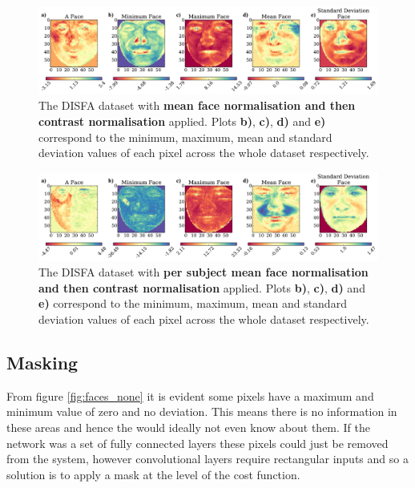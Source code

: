       \begin{figure}[!h] \centering
      \includegraphics[width =\hsize]{figures/faces_contrast_face.pdf}
      \caption{The DISFA dataset with {\bf mean face normalisation and then contrast normalisation} applied.
      Plots {\bf b)}, {\bf c)}, {\bf d)} and {\bf e)} correspond to the minimum,
      maximum, mean and standard deviation values of each pixel across the whole
      dataset respectively.} \label{fig:faces_contrast_face} \end{figure}

      \begin{figure}[!h] \centering
      \includegraphics[width =\hsize]{figures/faces_per_subject_contrast_face.pdf}
      \caption{The DISFA dataset with {\bf per subject mean face normalisation and then contrast normalisation} applied.
      Plots {\bf b)}, {\bf c)}, {\bf d)} and {\bf e)} correspond to the minimum,
      maximum, mean and standard deviation values of each pixel across the whole
      dataset respectively.} \label{fig:faces_per_subject_contrast_face} \end{figure}

    \subsection{Masking} \label{sec:mask}
      From figure \ref{fig:faces_none} it is evident some pixels have a maximum and minimum value
      of zero and no deviation. This means there is no information in these areas and hence
      the would ideally not even know about them. If the network was a set of fully connected layers
      these pixels could just be removed from the system, however convolutional layers require
      rectangular inputs and so a solution is to apply a mask at the level of the cost function.

